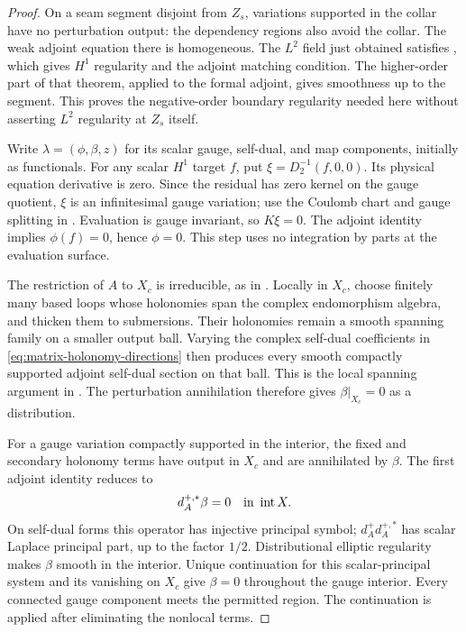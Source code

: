 \documentclass[11pt]{amsart}
\theoremstyle{definition}
\theoremstyle{remark}
\theoremstyle{plain}
\begin{document}
\begin{proof}
On a seam segment disjoint from $Z_s$, variations supported in
the collar have no perturbation output: the dependency regions
also avoid the collar. The weak adjoint equation there is
homogeneous. The $L^2$ field just obtained satisfies
\cite[Theorem~5.9(ii)]{DaeFukLip21b}, which gives $H^1$ regularity
and the adjoint matching condition. The higher-order part of that
theorem, applied to the formal adjoint, gives smoothness up to
the segment. This proves the negative-order boundary regularity
needed here without asserting $L^2$ regularity at $Z_s$ itself.

Write $\lambda=(\phi,\beta,z)$ for its scalar gauge, self-dual,
and map components, initially as functionals. For any scalar
$H^1$ target $f$, put $\xi=D_2^{-1}(f,0,0)$. Its physical
equation derivative is zero. Since the residual has zero kernel
on the gauge quotient, $\xi$ is an infinitesimal gauge variation;
use the Coulomb chart and gauge splitting in
\cite[Propositions~3.10 and~4.6]{DaeFukLip21a}.
Evaluation is gauge invariant, so $K\xi=0$. The adjoint identity
implies $\phi(f)=0$, hence $\phi=0$. This step uses no integration
by parts at the evaluation surface.

The restriction of $A$ to $X_c$ is irreducible, as in
\cite[Section~6.2]{DaeFukLip21a}. Locally in $X_c$, choose
finitely many based loops whose holonomies span the complex
endomorphism algebra, and thicken them to submersions. Their
holonomies remain a smooth spanning family on a smaller output
ball. Varying the complex self-dual coefficients in
\eqref{eq:matrix-holonomy-directions} then produces every smooth
compactly supported adjoint self-dual section on that ball.
This is the local spanning argument in
\cite[Lemma~13]{Kronheimer05}. The perturbation annihilation
therefore gives $\beta|_{X_c}=0$ as a distribution.

For a gauge variation compactly supported in the interior, the
fixed and secondary holonomy terms have output in $X_c$ and
are annihilated by $\beta$. The first adjoint identity reduces to
\begin{equation}\label{eq:separated-gauge-adjoint}
                 d_A^{+,*}\beta=0\quad\hbox{in }\operatorname{int}X .
\end{equation}
On self-dual forms this operator has injective principal symbol;
$d_A^+d_A^{+,*}$ has scalar Laplace principal part, up to the
factor $1/2$. Distributional elliptic regularity makes $\beta$
smooth in the interior. Unique continuation for this
scalar-principal system \cite[Remark~3]{Aronszajn57} and its
vanishing on $X_c$ give $\beta=0$ throughout the gauge interior.
Every connected gauge component meets the permitted region.
The continuation is applied after eliminating the nonlocal terms.


\end{proof}
\end{document}
